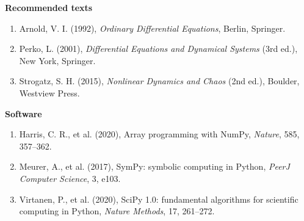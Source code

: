 \documentclass[11pt,a4paper]{article}
\numberwithin{equation}{section}
\theoremstyle{definition}
\newcommand{\subhead}[1]{%
  \par\medskip\noindent\textbf{#1}\par\nobreak\smallskip}
\begin{document}
\subhead{Recommended texts}
\begin{enumerate}
\item Arnold, V. I. (1992), \emph{Ordinary Differential Equations}, Berlin, Springer.
\item Perko, L. (2001), \emph{Differential Equations and Dynamical Systems} (3rd ed.), New York, Springer.
\item Strogatz, S. H. (2015), \emph{Nonlinear Dynamics and Chaos} (2nd ed.), Boulder, Westview Press.
\end{enumerate}

\subhead{Software}
\begin{enumerate}
\item Harris, C. R., et al. (2020), Array programming with NumPy, \emph{Nature}, 585, 357--362.
\item Meurer, A., et al. (2017), SymPy: symbolic computing in Python, \emph{PeerJ Computer Science}, 3, e103.
\item Virtanen, P., et al. (2020), SciPy 1.0: fundamental algorithms for scientific computing in Python, \emph{Nature Methods}, 17, 261--272.
\end{enumerate}
\end{document}
